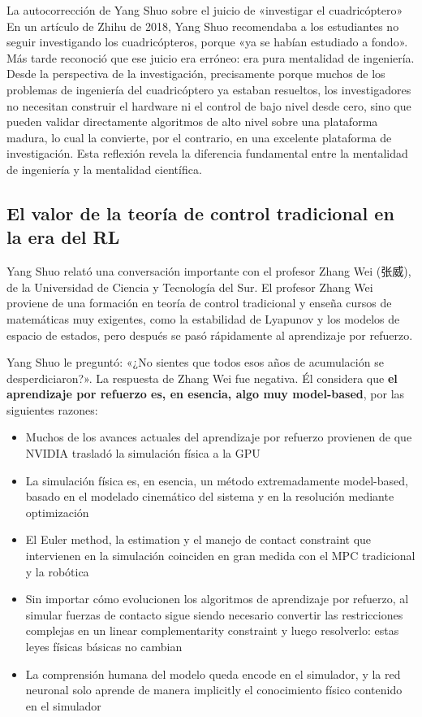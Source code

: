 \documentclass[a4paper]{article}
\begin{document}
\begin{knowledgebox}{La autocorrección de Yang Shuo sobre el juicio de «investigar el cuadricóptero»}
En un artículo de Zhihu de 2018, Yang Shuo recomendaba a los estudiantes no seguir investigando los cuadricópteros, porque «ya se habían estudiado a fondo». Más tarde reconoció que ese juicio era erróneo: era pura mentalidad de ingeniería. Desde la perspectiva de la investigación, precisamente porque muchos de los problemas de ingeniería del cuadricóptero ya estaban resueltos, los investigadores no necesitan construir el hardware ni el control de bajo nivel desde cero, sino que pueden validar directamente algoritmos de alto nivel sobre una plataforma madura, lo cual la convierte, por el contrario, en una excelente plataforma de investigación. Esta reflexión revela la diferencia fundamental entre la mentalidad de ingeniería y la mentalidad científica.
\end{knowledgebox}

\subsection{El valor de la teoría de control tradicional en la era del RL}

Yang Shuo relató una conversación importante con el profesor Zhang Wei (张威), de la Universidad de Ciencia y Tecnología del Sur. El profesor Zhang Wei proviene de una formación en teoría de control tradicional y enseña cursos de matemáticas muy exigentes, como la estabilidad de Lyapunov y los modelos de espacio de estados, pero después se pasó rápidamente al aprendizaje por refuerzo.

Yang Shuo le preguntó: «¿No sientes que todos esos años de acumulación se desperdiciaron?». La respuesta de Zhang Wei fue negativa. Él considera que \textbf{el aprendizaje por refuerzo es, en esencia, algo muy model-based}, por las siguientes razones:

\begin{itemize}
    \item Muchos de los avances actuales del aprendizaje por refuerzo provienen de que NVIDIA trasladó la simulación física a la GPU
    \item La simulación física es, en esencia, un método extremadamente model-based, basado en el modelado cinemático del sistema y en la resolución mediante optimización
    \item El Euler method, la estimation y el manejo de contact constraint que intervienen en la simulación coinciden en gran medida con el MPC tradicional y la robótica
    \item Sin importar cómo evolucionen los algoritmos de aprendizaje por refuerzo, al simular fuerzas de contacto sigue siendo necesario convertir las restricciones complejas en un linear complementarity constraint y luego resolverlo: estas leyes físicas básicas no cambian
    \item La comprensión humana del modelo queda encode en el simulador, y la red neuronal solo aprende de manera implicitly el conocimiento físico contenido en el simulador
\end{itemize}
\end{document}
